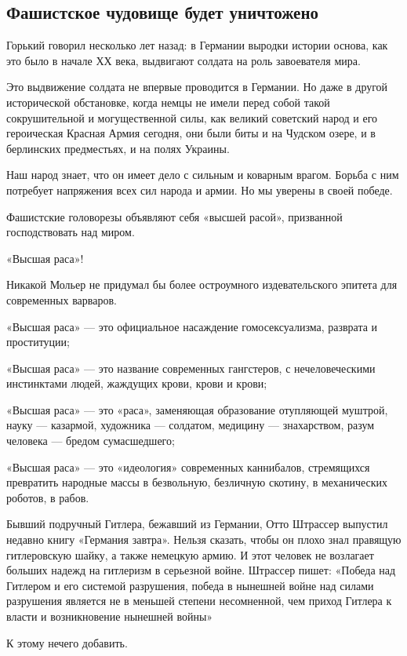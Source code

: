 \documentclass[12pt, a4paper, openany]{book}
\begin{document}
	\subsection*{\center \textbf{Фашистское чудовище будет уничтожено}}


Горький говорил несколько лет назад: в Германии выродки истории основа, как это было в начале ХХ века, выдвигают солдата на роль завоевателя мира.

Это выдвижение солдата не впервые проводится в Германии. Но даже в другой исторической обстановке, когда немцы не имели перед собой такой сокрушительной и могущественной силы, как великий советский народ и его героическая Красная Армия сегодня, они были биты и на Чудском озере, и в берлинских предместьях, и на полях Украины.

Наш народ знает, что он имеет дело с сильным и коварным врагом. Борьба с ним потребует напряжения всех сил народа и армии. Но мы уверены в своей победе.

Фашистские головорезы объявляют себя «высшей расой», призванной господствовать над миром.

«Высшая раса»!

Никакой Мольер не придумал бы более остроумного издевательского эпитета для современных варваров.

«Высшая раса» — это официальное насаждение гомосексуализма, разврата и проституции;

«Высшая раса» — это название современных гангстеров, с нечеловеческими инстинктами людей, жаждущих крови, крови и крови;

«Высшая раса» — это «раса», заменяющая образование отупляющей муштрой, науку — казармой, художника — солдатом, медицину — знахарством, разум человека — бредом сумасшедшего;

«Высшая раса» — это «идеология» современных каннибалов, стремящихся превратить народные массы в безвольную, безличную скотину, в механических роботов, в рабов.

Бывший подручный Гитлера, бежавший из Германии, Отто Штрассер выпустил недавно книгу «Германия завтра». Нельзя сказать, чтобы он плохо знал правящую гитлеровскую шайку, а также немецкую армию. И этот человек не возлагает больших надежд на гитлеризм в серьезной войне. Штрассер пишет: «Победа над Гитлером и его системой разрушения, победа в нынешней войне над силами разрушения является не в меньшей степени несомненной, чем приход Гитлера к власти и возникновение нынешней войны»

К этому нечего добавить.
\end{document}
